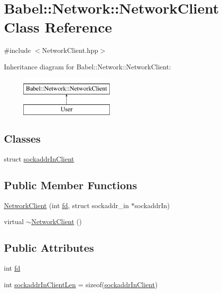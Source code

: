 \hypertarget{classBabel_1_1Network_1_1NetworkClient}{}\section{Babel\+:\+:Network\+:\+:Network\+Client Class Reference}
\label{classBabel_1_1Network_1_1NetworkClient}


{\ttfamily \#include $<$Network\+Client.\+hpp$>$}

Inheritance diagram for Babel\+:\+:Network\+:\+:Network\+Client\+:\begin{figure}[H]
\begin{center}
\leavevmode
\includegraphics[height=2.000000cm]{classBabel_1_1Network_1_1NetworkClient}
\end{center}
\end{figure}
\subsection*{Classes}
\begin{DoxyCompactItemize}
\item 
struct \hyperlink{structBabel_1_1Network_1_1NetworkClient_1_1sockaddrInClient}{sockaddr\+In\+Client}
\end{DoxyCompactItemize}
\subsection*{Public Member Functions}
\begin{DoxyCompactItemize}
\item 
\hyperlink{classBabel_1_1Network_1_1NetworkClient_a656979ee6f83ec94be79d682dbbc52b3}{Network\+Client} (int \hyperlink{classBabel_1_1Network_1_1NetworkClient_ae1d6dc854cbc956a4bd00d059265fb02}{fd}, struct sockaddr\+\_\+in $\ast$sockaddr\+In)
\item 
virtual \hyperlink{classBabel_1_1Network_1_1NetworkClient_ab82fb597494c89b4a7ba9fd0d4b659c4}{$\sim$\+Network\+Client} ()
\end{DoxyCompactItemize}
\subsection*{Public Attributes}
\begin{DoxyCompactItemize}
\item 
int \hyperlink{classBabel_1_1Network_1_1NetworkClient_ae1d6dc854cbc956a4bd00d059265fb02}{fd}
\item 
int \hyperlink{classBabel_1_1Network_1_1NetworkClient_affb6a43d2d5b005e83f740ca8f3d19f5}{sockaddr\+In\+Client\+Len} = sizeof(\hyperlink{structBabel_1_1Network_1_1NetworkClient_1_1sockaddrInClient}{sockaddr\+In\+Client})
\end{DoxyCompactItemize}


